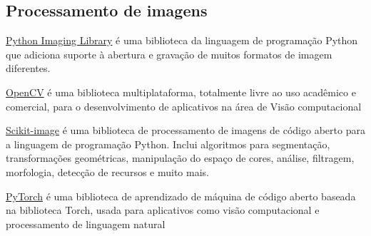 \subsection{Processamento de imagens}

\underline{Python Imaging Library}
é uma biblioteca da linguagem de programação Python que adiciona suporte à abertura e gravação de muitos formatos de imagem diferentes.

\underline{OpenCV}
é uma biblioteca multiplataforma, totalmente livre ao uso acadêmico e comercial, para o desenvolvimento de aplicativos na área de Visão computacional

\underline{Scikit-image}
é uma biblioteca de processamento de imagens de código aberto para a linguagem de programação Python. Inclui algoritmos para segmentação, transformações geométricas, manipulação do espaço de cores, análise, filtragem, morfologia, detecção de recursos e muito mais.

\underline{PyTorch}
é uma biblioteca de aprendizado de máquina de código aberto baseada na biblioteca Torch, usada para aplicativos como visão computacional e processamento de linguagem natural
